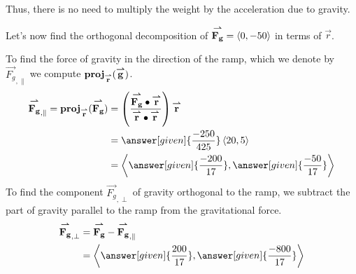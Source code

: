 \documentclass{ximera}
\begin{document}
\begin{example}
\begin{remark}
Thus, there is no need to multiply the weight by the acceleration due to gravity.
\end{remark} 
  

Let's now find the orthogonal decomposition of ${\overset{\boldsymbol{\rightharpoonup}}{\mathbf{F_g}}} =
  \left\langle 0,-50\right\rangle$ in terms of $\vec{r}$. 
  
    \begin{explanation}
    To find the force of gravity in the direction of the ramp, which we denote by $\vec{F_g}_{, \parallel}$ we
    compute $\operatorname{\mathbf{proj}}_{\overset{\boldsymbol{\rightharpoonup}}{\mathbf{r}}}({\overset{\boldsymbol{\rightharpoonup}}{\mathbf{g}}})$.
    \begin{align*}
     \vec{F_g}_{, \parallel} = \proj_\vec{r}(\vec{F_g}) &= \left(\frac{\vec{F_g}\dotp\vec{r}}{\vec{r}\dotp\vec{r}}\right)\vec r\\
      &=  \answer[given]{\frac{-250}{425}}\vector{20,5}\\
      &= \vector{\answer[given]{\frac{-200}{17}},\answer[given]{\frac{-50}{17}}}
    \end{align*}
    To find the component $\vec{F_g}_{, \perp}$ of gravity orthogonal to the ramp, we subtract the part of gravity parallel to the ramp from the gravitational force.
    \begin{align*}
      \vec{F_g}_{, \perp} &= \vec{F_g} - \vec{F_g}_{, \parallel} \\
      &= \vector{\answer[given]{\frac{200}{17}},\answer[given]{\frac{-800}{17}}}
    \end{align*}
    \begin{image}
    \end{image}
    

\end{explanation}
\end{example}
\end{document}
